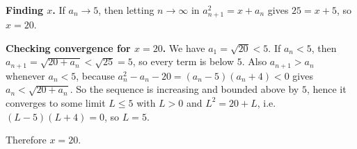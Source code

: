 \textbf{Finding $x$.} If $a_n\to5$, then letting $n\to\infty$ in $a_{n+1}^2=x+a_n$ gives $25=x+5$, so $x=20$.

\textbf{Checking convergence for $x=20$.} We have $a_1=\sqrt{20}<5$. If $a_n<5$, then $a_{n+1}=\sqrt{20+a_n}<\sqrt{25}=5$, so every term is below $5$. Also $a_{n+1}>a_n$ whenever $a_n<5$, because $a_n^2-a_n-20=(a_n-5)(a_n+4)<0$ gives $a_n<\sqrt{20+a_n}$. So the sequence is increasing and bounded above by $5$, hence it converges to some limit $L\le5$ with $L>0$ and $L^2=20+L$, i.e.\ $(L-5)(L+4)=0$, so $L=5$.

Therefore $x=\boxed{20}$.
